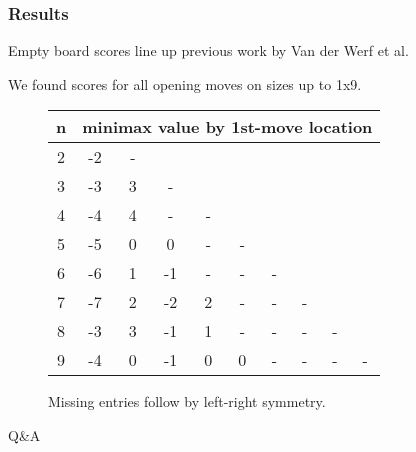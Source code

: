 \documentclass{beamer}
\begin{document}
    \begin{frame}
        \frametitle{Results}
        Empty board scores line up previous work by Van der Werf et al.

        We found scores for all opening moves on sizes up to 1x9.

        \begin{figure}[th]
        \begin{tabular}{|c|ccccccccc|} \hline
        n & \multicolumn{9}{c|}{minimax value by 1st-move location} \\ \hline
        2 & -2 & - &&&&&&& \\
        3 & -3 & 3 & - &&&&&& \\
        4 & -4 & 4 & - & - &&&&& \\
        5 & -5 & 0 & 0 & - & - &&&& \\
        6 & -6 & 1 & -1 & - & - & - &&&\\
        7 & -7 &  2 & -2 & 2 & - & - & - &&\\
        8 & -3 &  3 & -1 & 1 & - & - & - & - &\\
        9 & -4 & 0  & -1  & 0 & 0 & - & - & - & -\\ \hline
        \end{tabular}
        \caption{Missing entries follow by left-right symmetry.}\label{fig:1st_move_value}
        \label{fig:mmx}
        \end{figure}
    \end{frame}

    \begin{frame}
        \begin{center}
            {\huge Q\&A}
        \end{center}
    \end{frame}
\end{document}
